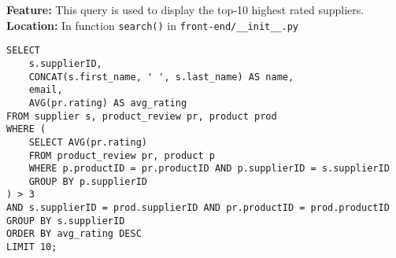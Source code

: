 \textbf{Feature:} This query is used to display the top-10 highest rated suppliers. \\
\textbf{Location:} In function \texttt{search()} in \texttt{front-end/\_\_init\_\_.py}

\begin{lstlisting}
SELECT
    s.supplierID,
    CONCAT(s.first_name, ' ', s.last_name) AS name,
    email,
    AVG(pr.rating) AS avg_rating
FROM supplier s, product_review pr, product prod
WHERE (
    SELECT AVG(pr.rating)
    FROM product_review pr, product p
    WHERE p.productID = pr.productID AND p.supplierID = s.supplierID
    GROUP BY p.supplierID
) > 3
AND s.supplierID = prod.supplierID AND pr.productID = prod.productID
GROUP BY s.supplierID
ORDER BY avg_rating DESC
LIMIT 10;
\end{lstlisting}